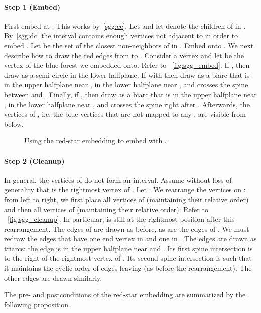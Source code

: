 \documentclass[11pt,a4paper,colorlinks=true,urlcolor=blue,citecolor=red]{article}
\theoremstyle{plain}
\newcommand{\subsubparagraph}[1]{\paragraph{#1}}
\begin{document}
\subsubparagraph{Step 1 (Embed)} First embed  at . This works
by~\ref{sgg:ec}. Let  and let  denote
the children of  in . By~\ref{sgg:dc} the interval  contains
enough vertices not adjacent to  in order to embed
. Let  be the set of the  closest non-neighbors of
 in . Embed  onto . We next describe how
to draw the red edges from  to . Consider a vertex
 and let  be the vertex of the blue forest we embedded 
onto.  Refer to \figurename~\ref{fig:sgg_embed}. If ,
then draw  as a semi-circle in the lower halfplane. If
 with  then draw  as a biarc that
is in the upper halfplane near , in the lower halfplane near ,
and crosses the spine between  and .  Finally, if
, then draw  as a biarc that is in the
upper halfplane near , in the lower halfplane near , and crosses
the spine right after . Afterwards, the vertices of
, i.e. the blue vertices that are not mapped to any
, are visible from below.

\begin{figure}
  \centering\hfil {}\hfil {}\hfil {}\hfil \caption{Using the red-star embedding to embed  with
    .}
  \label{fig:sgg}
\end{figure}


\subsubparagraph{Step 2 (Cleanup)} In general, the vertices of
 do not form an interval. Assume without loss of
generality that  is the rightmost vertex of . Let
. We rearrange the vertices on : from left to
right, we first place all vertices of  (maintaining
their relative order) and then all vertices of  (maintaining their
relative order). Refer to \figurename~\ref{fig:sgg_cleanup}. In
particular,  is still at the rightmost position after this
rearrangement. The edges of  are drawn as before, as
are the edges of . We must redraw the edges that have one end
vertex in  and one in . The edges
 are drawn as triarcs: the edge is in the upper
halfplane near  and . Its first spine intersection is to
the right of the rightmost vertex of . Its second
spine intersection is such that it maintains the cyclic order of edges
leaving  (as before the rearrangement). The other edges are
drawn similarly.

The pre- and postconditions of the red-star embedding are
summarized by the following proposition.
\end{document}
